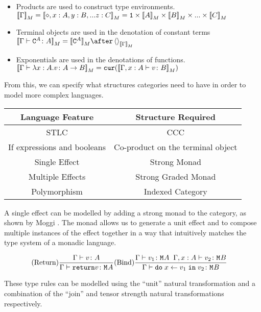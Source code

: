\documentclass{Report}
\begin{document}
\begin{itemize}
    \item Products are used to construct type environments. $\deno{\G} = \deno{\nil, x: A, y:B, ... z:C} = \1 \times \deno{A} \times \deno{B} \times ... \times \deno{C}$
    \item Terminal objects are used in the denotation of constant terms $\deno{\gtyperelation{\const{A}}{A}} = \deno{\const{A}}\after\term{\deno{\G}}$
    \item Exponentials are used in the denotations of functions. ${\bf [\![}\Gamma \vdash \lambda x : A. v \colon A\rightarrow B{\bf ]\!]}_M = \texttt{cur}({\bf [\![}\Gamma, x: A \vdash v \colon B{\bf ]\!]}_M)$
\end{itemize}

From this, we can specify what structures categories need to have in order to model more complex languages.
\begin{center}
    \begin{tabular}{|c|c|}
        \hline
        Language Feature & Structure Required \\
        \hline
        \hline
        STLC            & CCC \\
        \hline
        If expressions and booleans   & Co-product on the terminal object \\
        \hline
        Single Effect   & Strong Monad \\
        \hline
        Multiple Effects & Strong Graded Monad \\
        \hline
        Polymorphism & Indexed Category \\
        \hline
    \end{tabular}
\end{center}


A single effect can be modelled by adding a strong monad to the category, as shown by Moggi . The monad allows us to generate a unit effect and to compose multiple instances of the effect together in a way that intuitively matches the type system of a monadic language.

\begin{eqnarray}\label{MonadTypeRules}
    (\text{Return}) \frac{\Gamma \vdash v \colon A}{\Gamma \vdash \texttt{return} v \colon \texttt{M}_{}{A}} & (\text{Bind}) \frac{\Gamma \vdash v_1 \colon \texttt{M}_{}{A} \;\; \Gamma, x: A \vdash v_2 \colon \texttt{M}_{}{B}}{\Gamma \vdash \texttt{do}\; x \leftarrow v_1 \;\texttt{in}\; v_2 \colon \texttt{M}_{}{B}}
\end{eqnarray}

These type rules can be modelled using the ``unit'' natural transformation and a combination of the ``join'' and tensor strength natural transformations respectively. 
\end{document}
